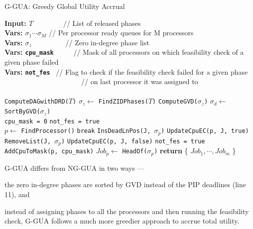 \documentclass[12pt,dvips]{report}
\renewcommand{\baselinestretch}{1}
\begin{document}
\linesnumbered
\renewcommand{\baselinestretch}{1.0}
\begin{algorithm2e}[!t]	
    \caption{G-GUA: Greedy Global Utility Accrual}
    \label{alg:GGUA}
     \textbf{Input: $T$} ~~~~~~~~// List of released phases\\
     \textbf{Vars: $\sigma_1 \cdots \sigma_M$} // Per processor ready queues for M  processors\\
     \textbf{Vars: $\sigma_{z}$} ~~~~~~~~~// Zero in-degree phase list\\
     \textbf{Vars: \texttt{cpu\_mask}} ~~~~~// Mask of all processors on which feasibility check of a given phase failed \\
     \textbf{Vars: \texttt{not\_fes}} ~// Flag to check if the feasibility check failed for a given phase\\
~~~~~~~~~~~~~~~~~~~~~~// on last processor it was assigned to \\
     
	~\\
	\texttt{ComputeDAGwithDRD($T$)}\;		
	$\sigma_{z}\leftarrow$ \texttt{FindZIDPhases($T$)}\;
	\texttt{ComputeGVD($\sigma_z$)}\;
	$\sigma_{d}\leftarrow$ \texttt{SortByGVD($\sigma_{z}$)}\;
	~\\
	 {
		\texttt{cpu\_mask = 0}\;
		\texttt{not\_fes = true}\;
		~\\
		 {
			$p\leftarrow$ \texttt{FindProcessor()}\;
			 {
				\texttt{break}\;
			}
			\texttt{InsDeadLnPos(J, $\sigma_p$)}\;
			\texttt{UpdateCpuEC(p, J, true)}\;
			~\\	
			 {
				\texttt{RemoveList(J, $\sigma_p$)}\;
				\texttt{UpdateCpuEC(p, J, false)}\;
				\texttt{not\_fes = true}\;
				\texttt{AddCpuToMask(p, cpu\_mask)\;}
			} 
		}
	}
	 {
		$Job_p\leftarrow$ \texttt{HeadOf($\sigma_p$)} \;
	}
    \textbf{return} \{ $Job_1, \cdots , Job_m $ \}\;
\end{algorithm2e}

G-GUA differs from NG-GUA in two ways ---
\begin{inparaenum}[(i)]
	\item the zero in-degree phases are sorted by GVD instead of the PIP deadlines (line 11), and
	\item instead of assigning phases to all the processors and then running the feasibility check, G-GUA follows a much more greedier approach to accrue total utility.
\end{inparaenum}
\end{document}
